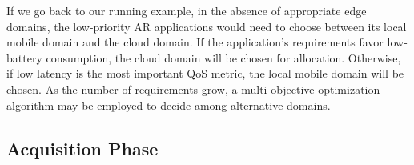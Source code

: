 


If we go back to our running example, in the absence of appropriate edge domains, the low-priority AR applications would need to choose between its local mobile domain and the cloud domain. If the application's requirements favor low-battery consumption, the cloud domain will be chosen for allocation. Otherwise, if low latency is the most important QoS metric, the local mobile domain will be chosen. As the number of requirements grow, a multi-objective optimization algorithm may be employed to decide among alternative domains.







\subsection*{Acquisition Phase}\label{sec:A3-E-acquisition}

